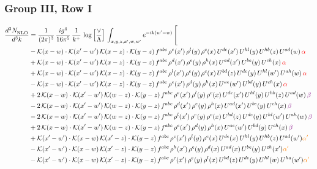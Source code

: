\documentclass[9pt]{article}
\numberwithin{equation}{section}
\begin{document}
\subsubsection{Group III, Row I}
\begin{align}
     \frac{d^{3}N_{\rm NLO}^{\rm}}{d^{3}k}  & = \frac{1}{(2\pi)^{3}}\, \frac{ig^{4}}{16\pi^{5}}\, \frac{1}{k^{+}}\, \log{\left[\frac{\vee}{\Lambda}\right]}\, \int_{x,y,z,x^{\prime},w,w^{\prime}}e^{-ik(w^{\prime}-w)}\, \Bigg[\notag \\ & -\mathcal{K}(x-w)\cdot \mathcal{K}(x'-w')\, \mathcal{K}(x-z)\cdot \mathcal{K}(y-z)\, f^{abc}\, \rho^{e}(x')\,\rho^{l}(y)\,\rho^{c}(x)\,U^{de}(x')\,U^{hl}(y)\,U^{hb}(z)\,U^{ad}(w)\, {\color{red}\alpha} \notag \\ & +\mathcal{K}(x-w)\cdot \mathcal{K}(x'-w')\, \mathcal{K}(x-z)\cdot \mathcal{K}(y-z)\, f^{abc}\, \rho^{d}(x')\,\rho^{e}(y)\,\rho^{h}(x)\,U^{ad}(x')\,U^{be}(y)\,U^{ch}(x)\, {\color{red}\alpha} \notag \\ & + \mathcal{K}(x-w)\cdot \mathcal{K}(x'-w')\, \mathcal{K}(x-z)\cdot \mathcal{K}(y-z)\, f^{abc}\, \rho^{l}(x')\,\rho^{e}(y)\,\rho^{c}(x)\,U^{bd}(z)\,U^{de}(y)\,U^{hl}(w')\,U^{ah}(w)\, {\color{red}\alpha} \notag \\ & -\mathcal{K}(x-w)\cdot \mathcal{K}(x'-w')\, \mathcal{K}(x-z)\cdot \mathcal{K}(y-z)\, f^{abc}\, \rho^{e}(x')\,\rho^{d}(y)\,\rho^{h}(x)\,U^{ae}(w')\,U^{bd}(y)\,U^{ch}(x)\, {\color{red}\alpha} \notag \\ & +2\, \mathcal{K}(x-w)\cdot \mathcal{K}(x'-w')\, \mathcal{K}(w-z) \cdot \mathcal{K}(y-z)\, f^{abc}\, \rho^{e}(x')\,\rho^{l}(y)\, \rho^{c}(x)\, U^{de}(x')\,U^{hl}(y)\,U^{hb}(z)\,U^{ad}(w)\, {\color{violet} \beta} \notag \\ & -2\, \mathcal{K}(x-w)\cdot \mathcal{K}(x'-w')\, \mathcal{K}(w-z) \cdot \mathcal{K}(y-z)\, f^{abc}\, \rho^{d}(x')\,\rho^{e}(y)\, \rho^{h}(x)\, U^{ad}(x')\,U^{be}(y)\,U^{ch}(x)\, {\color{violet} \beta}\notag \\ & -2\, \mathcal{K}(x-w)\cdot \mathcal{K}(x'-w')\, \mathcal{K}(w-z) \cdot \mathcal{K}(y-z)\, f^{abc}\, \rho^{l}(x')\,\rho^{e}(y)\, \rho^{c}(x)\, U^{bd}(z)\,U^{de}(y)\,U^{hl}(w')\,U^{ah}(w)\, {\color{violet} \beta}\notag \\ & + 2\, \mathcal{K}(x-w)\cdot \mathcal{K}(x'-w')\, \mathcal{K}(w-z) \cdot \mathcal{K}(y-z)\, f^{abc}\, \rho^{e}(x')\,\rho^{d}(y)\, \rho^{h}(x)\, U^{ae}(w')\,U^{bd}(y)\,U^{ch}(x)\, {\color{violet} \beta}\notag \\ & +\mathcal{K}(x'-w')\cdot\mathcal{K}(x-w)\,\mathcal{K}(x'-z)\cdot\mathcal{K}(y-z)\, f^{abc}\,\rho^{c}(x')\,\rho^{l}(y)\,\rho^{e}(x)\,U^{de}(x)\,U^{hl}(y)\,U^{hb}(z)\,U^{ad}(w'){\color{orange} \alpha'}\notag\\ &-\mathcal{K}(x'-w')\cdot\mathcal{K}(x-w)\,\mathcal{K}(x'-z)\cdot\mathcal{K}(y-z)\, f^{abc}\,\rho^{h}(x')\,\rho^{e}(y)\,\rho^{d}(x)\,U^{ad}(x)\,U^{be}(y)\,U^{ch}(x'){\color{orange} \alpha'}\notag\\ &-\mathcal{K}(x'-w')\cdot\mathcal{K}(x-w)\,\mathcal{K}(x'-z)\cdot\mathcal{K}(y-z)\, f^{abc}\,\rho^{c}(x')\,\rho^{e}(y)\,\rho^{l}(x)\,U^{bd}(z)\,U^{de}(y)\,U^{hl}(w)\,U^{ha}(w'){\color{orange} \alpha'}\notag \\ 
\end{align}
\end{document}

